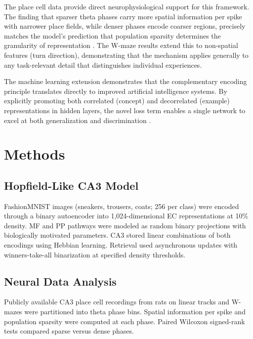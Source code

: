 \documentclass[11pt]{article}
\begin{document}
The place cell data provide direct neurophysiological support for this framework. The finding that sparser theta phases carry more spatial information per spike with narrower place fields, while denser phases encode coarser regions, precisely matches the model's prediction that population sparsity determines the granularity of representation \citep{neunuebel2014ca3, hainmueller2018parallel}. The W-maze results extend this to non-spatial features (turn direction), demonstrating that the mechanism applies generally to any task-relevant detail that distinguishes individual experiences.

The machine learning extension demonstrates that the complementary encoding principle translates directly to improved artificial intelligence systems. By explicitly promoting both correlated (concept) and decorrelated (example) representations in hidden layers, the novel loss term enables a single network to excel at both generalization and discrimination \citep{caruana1997multitask, kumaran2016learning}.

\section{Methods}

\subsection{Hopfield-Like CA3 Model}

FashionMNIST images \citep{xiao2017fashionmnist} (sneakers, trousers, coats; 256 per class) were encoded through a binary autoencoder into 1,024-dimensional EC representations at 10\% density. MF and PP pathways were modeled as random binary projections with biologically motivated parameters. CA3 stored linear combinations of both encodings using Hebbian learning. Retrieval used asynchronous updates with winners-take-all binarization at specified density thresholds.

\subsection{Neural Data Analysis}

Publicly available CA3 place cell recordings from rats on linear tracks and W-mazes were partitioned into theta phase bins. Spatial information per spike \citep{skaggs1993information} and population sparsity were computed at each phase. Paired Wilcoxon signed-rank tests compared sparse versus dense phases.
\end{document}
